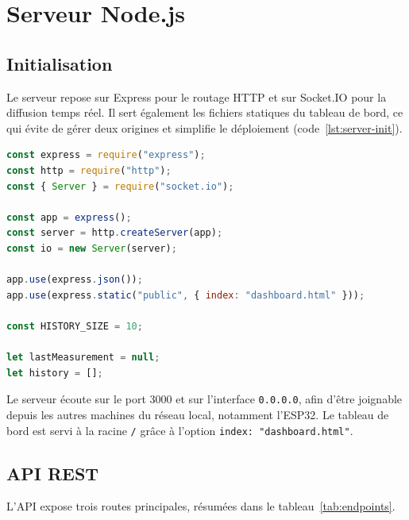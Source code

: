 \documentclass[11pt,a4paper]{article}
\begin{document}
\section{Serveur Node.js}

\subsection{Initialisation}

Le serveur repose sur Express pour le routage HTTP et sur Socket.IO pour la diffusion
temps réel. Il sert également les fichiers statiques du tableau de bord, ce qui évite de gérer
deux origines et simplifie le déploiement (code~\ref{lst:server-init}).

\begin{lstlisting}[language=JavaScript,firstnumber=1,
  caption={Initialisation du serveur Express et de Socket.IO (\texttt{nodeserver/server.js}).},
  label={lst:server-init}]
const express = require("express");
const http = require("http");
const { Server } = require("socket.io");

const app = express();
const server = http.createServer(app);
const io = new Server(server);

app.use(express.json());
app.use(express.static("public", { index: "dashboard.html" }));

const HISTORY_SIZE = 10;

let lastMeasurement = null;
let history = [];
\end{lstlisting}

Le serveur écoute sur le port 3000 et sur l'interface \texttt{0.0.0.0}, afin d'être joignable
depuis les autres machines du réseau local, notamment l'ESP32. Le tableau de bord est servi à
la racine \texttt{/} grâce à l'option \texttt{index: "dashboard.html"}.

\subsection{API REST}

L'API expose trois routes principales, résumées dans le tableau~\ref{tab:endpoints}.
\end{document}
